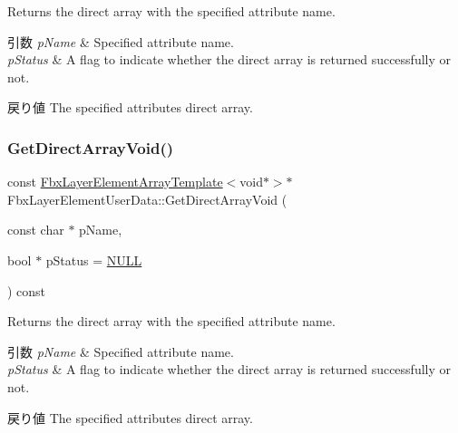 Returns the direct array with the specified attribute name. 
\begin{DoxyParams}{引数}
{\em p\+Name} & Specified attribute name. \\
\hline
{\em p\+Status} & A flag to indicate whether the direct array is returned successfully or not. \\
\hline
\end{DoxyParams}
\begin{DoxyReturn}{戻り値}
The specified attribute\textquotesingle{}s direct array. 
\end{DoxyReturn}
\mbox{\label{class_fbx_layer_element_user_data_a3dc62d940655a5afbf1e8893dba620a3}} 
\subsubsection{\texorpdfstring{Get\+Direct\+Array\+Void()}{GetDirectArrayVoid()}\hspace{0.1cm}{\footnotesize\ttfamily [4/4]}}
{\footnotesize\ttfamily const \hyperlink{class_fbx_layer_element_array_template}{Fbx\+Layer\+Element\+Array\+Template}$<$void$\ast$$>$$\ast$ Fbx\+Layer\+Element\+User\+Data\+::\+Get\+Direct\+Array\+Void (\begin{DoxyParamCaption}\item[{const char $\ast$}]{p\+Name,  }\item[{bool $\ast$}]{p\+Status = {\ttfamily \hyperlink{fbxarch_8h_a070d2ce7b6bb7e5c05602aa8c308d0c4}{N\+U\+LL}} }\end{DoxyParamCaption}) const}

Returns the direct array with the specified attribute name. 
\begin{DoxyParams}{引数}
{\em p\+Name} & Specified attribute name. \\
\hline
{\em p\+Status} & A flag to indicate whether the direct array is returned successfully or not. \\
\hline
\end{DoxyParams}
\begin{DoxyReturn}{戻り値}
The specified attribute\textquotesingle{}s direct array. 
\end{DoxyReturn}
\mbox{\label{class_fbx_layer_element_user_data_a6a7133826a8e21dc296e44109902e717}} 
